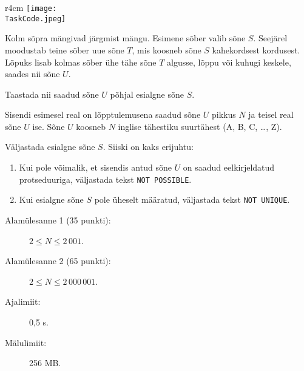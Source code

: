 \documentclass{boi2014-et}
\renewcommand{\TaskCode}{friends}
\begin{document}
    \begin{wrapfigure}{r}{4cm}
        \vspace{-24pt}
        \texttt{[image: \\TaskCode.jpeg]}
    \end{wrapfigure}

    Kolm sõpra mängivad järgmist mängu.
    Esimene sõber valib sõne $S$.
    Seejärel moodustab teine sõber uue sõne $T$, mis koosneb sõne $S$ kahekordsest kordusest.
    Lõpuks lisab kolmas sõber ühe tähe sõne $T$ algusse, lõppu või kuhugi keskele, saades nii sõne $U$.

    \Task

    Taastada nii saadud sõne $U$ põhjal esialgne sõne $S$.

    \Input

    Sisendi esimesel real on lõpptulemusena saadud sõne $U$ pikkus $N$ ja teisel real sõne $U$ ise.
    Sõne $U$ koosneb $N$ inglise tähestiku suurtähest (A, B, C, \ldots, Z).

    \Output

    Väljastada esialgne sõne $S$.
    Siiski on kaks erijuhtu:
    \begin{enumerate}
        \item Kui pole võimalik, et sisendis antud sõne $U$ on saadud eelkirjeldatud
            protseduuriga, väljastada tekst {\tt NOT POSSIBLE}.
        \item Kui esialgne sõne $S$ pole üheselt määratud, väljastada tekst {\tt NOT UNIQUE}.
    \end{enumerate}

    \Examples


    \Scoring

    \begin{description}
        \item[Alamülesanne 1 (35 punkti):] $2 \le N \le 2\,001$.
        \item[Alamülesanne 2 (65 punkti):] $2 \le N \le 2\,000\,001$.
    \end{description}

    \Constraints

    \begin{description}
        \item[Ajalimiit:] 0,5 s.
        \item[Mälulimiit:] 256 MB.
    \end{description}
\end{document}
